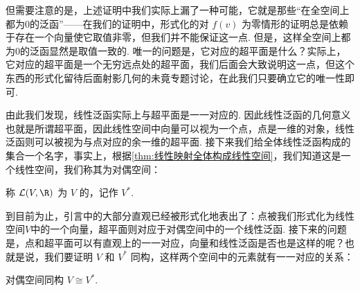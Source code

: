但需要注意的是，上述证明中我们实际上漏了一种可能，它就是那些``在全空间上都为$0$的泛函''——在我们的证明中，形式化的对 $f(v)$ 为零情形的证明总是依赖于存在一个向量使它取值非零，但我们并不能保证这一点. 但是，这样全空间上都为$0$的泛函显然是取值一致的. 唯一的问题是，它对应的超平面是什么？实际上，它对应的超平面是一个无穷远点处的超平面，我们后面会大致说明这一点，但这个东西的形式化留待后面射影几何的未竟专题讨论，在此我们只要确立它的唯一性即可.

由此我们发现，线性泛函实际上与超平面是一一对应的. 因此线性泛函的几何意义也就是所谓超平面，因此线性空间中向量可以视为一个点，点是一维的对象，线性泛函则可以被视为与点对应的余一维的超平面. 接下来我们给全体线性泛函构成的集合一个名字，事实上，根据\autoref{thm:线性映射全体构成线性空间}，我们知道这是一个线性空间，我们称其为对偶空间：
\begin{definition}{}{}
    称 $\mathcal{L}(V, \R)$ 为 $V$ 的，记作 $V^*$.
\end{definition}

到目前为止，引言中的大部分直观已经被形式化地表出了：点被我们形式化为线性空间$V$中的一个向量，超平面则对应于对偶空间中的一个线性泛函. 接下来的问题是，点和超平面可以有直观上的一一对应，向量和线性泛函是否也是这样的呢？也就是说，我们要证明 $V$ 和 $V^*$ 同构，这样两个空间中的元素就有一一对应的关系：


\begin{theorem}{}{对偶空间同构}
    $V \cong V^*$.
\end{theorem}

